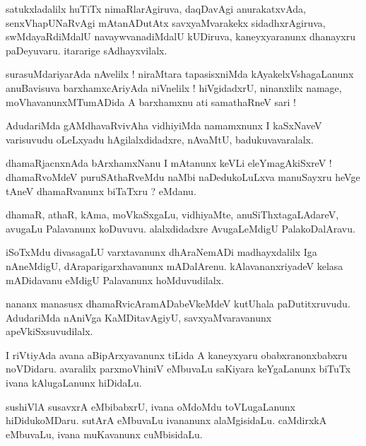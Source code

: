 \documentclass{article}
\begin{document}
\begin{mn}
satukxladalilx huTiTx nimaRlarAgiruva, daqDavAgi anurakatxvAda, senxVhapUNaRvAgi mAtanADutAtx 
savxyaMvarakekx sidadhxrAgiruva, swMdayaRdiMdalU navaywvanadiMdalU kUDiruva, kaneyxyaranunx 
dhanayxru paDeyuvaru. itararige sAdhayxvilalx.
\end{mn}

\begin{mn}
surasuMdariyarAda nAvelilx ! niraMtara tapasisxniMda kAyakelxVshagaLanunx anuBavisuva 
barxhamxcAriyAda niVnelilx ! hiVgidadxrU, ninanxlilx namage, moVhavanunxMTumADida A barxhamxnu 
ati samathaRneV sari !
\end{mn}

\begin{mn}
AdudariMda  gAMdhavaRvivAha vidhiyiMda namamxnunx I kaSxNaveV varisuvudu oLeLxyadu hAgilalxdidadxre,
nAvaMtU, badukuvavaralalx.
\end{mn}

\begin{mn}
dhamaRjacnxnAda bArxhamxNanu I mAtanunx keVLi eleYmagAkiSxreV ! dhamaRvoMdeV puruSAthaRveMdu 
naMbi naDedukoLuLxva manuSayxru heVge tAneV dhamaRvanunx biTaTxru ? eMdanu.
\end{mn}

\begin{mn}
dhamaR, athaR, kAma, moVkaSxgaLu, vidhiyaMte, anuSiThxtagaLAdareV, avugaLu Palavanunx  koDuvuvu.
alalxdidadxre AvugaLeMdigU PalakoDalAravu.
\end{mn}

\begin{mn}
iSoTxMdu divasagaLU varxtavanunx dhAraNemADi madhayxdalilx Iga nAneMdigU, dAraparigarxhavanunx 
mADalArenu. kAlavananxriyadeV kelasa mADidavanu eMdigU Palavanunx hoMduvudilalx.
\end{mn}

\begin{mn}
nananx manasusx dhamaRvicAramADabeVkeMdeV kutUhala paDutitxruvudu. AdudariMda nAniVga KaMDitavAgiyU,
savxyaMvaravanunx apeVkiSxsuvudilalx.
\end{mn}

\begin{mn}
I riVtiyAda avana aBipArxyavanunx tiLida A kaneyxyaru obabxranonxbabxru noVDidaru. avaralilx 
parxmoVhiniV eMbuvaLu saKiyara keYgaLanunx biTuTx ivana kAlugaLanunx hiDidaLu.
\end{mn}

\begin{mn}
sushiVlA susavxrA eMbibabxrU, ivana oMdoMdu toVLugaLanunx hiDidukoMDaru. sutArA eMbuvaLu ivananunx 
alaMgisidaLu. caMdirxkA eMbuvaLu, ivana muKavanunx cuMbisidaLu.
\end{mn}
\end{document}
